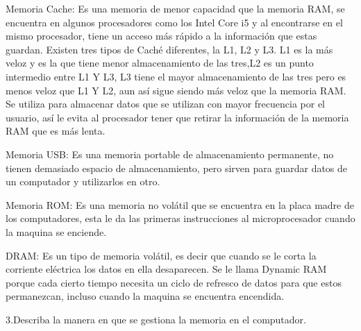\documentclass{article}
\begin{document}
Memoria Cache: Es una memoria de menor capacidad que la memoria RAM, se encuentra en algunos procesadores como los Intel Core i5 y al encontrarse en el mismo procesador, tiene un acceso más rápido a la información que estas guardan. Existen tres tipos de Caché diferentes, la L1, L2 y L3. L1 es la más veloz y es la que tiene menor almacenamiento de las tres,L2 es un punto intermedio entre L1 Y L3, L3 tiene el mayor almacenamiento de las tres pero es menos veloz que L1 Y L2, aun así sigue siendo más veloz que la memoria RAM. Se utiliza para almacenar datos que se utilizan con mayor frecuencia por el usuario, así le evita al procesador tener que retirar la información de la memoria RAM que es más lenta.

Memoria USB: Es una memoria portable de almacenamiento permanente, no tienen demasiado espacio de almacenamiento, pero sirven para guardar datos de un computador y utilizarlos en otro.

Memoria ROM: Es una memoria no volátil que se encuentra en la placa madre de los computadores, esta le da las primeras instrucciones al microprocesador cuando la maquina se enciende.

DRAM: Es un tipo de memoria volátil, es decir que cuando se le corta la corriente eléctrica los datos en ella desaparecen. Se le llama Dynamic RAM porque cada cierto tiempo necesita un ciclo de refresco de datos para que estos permanezcan, incluso cuando la maquina se encuentra encendida.\cite{uruguayoc}


3.Describa la manera en que se gestiona la memoria en el computador.
\end{document}
